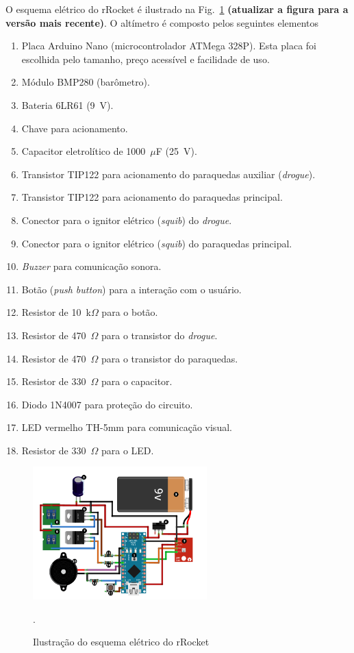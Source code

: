 \documentclass[12pt,a4paper]{article}
\begin{document}
O esquema elétrico do rRocket é ilustrado na Fig.~\ref{fig:rRocketelectronics} \textbf{(atualizar a figura para a versão mais recente)}. O altímetro é composto pelos seguintes elementos
\begin{enumerate}
	\item Placa Arduino Nano (microcontrolador ATMega 328P). Esta placa foi escolhida pelo tamanho, preço acessível e facilidade de uso.
	\item Módulo BMP280 (barômetro).
	\item Bateria 6LR61 (9~V).
	\item Chave para acionamento.
	\item Capacitor eletrolítico de 1000~$\mu$F (25~V).
	\item Transistor TIP122 para acionamento do paraquedas auxiliar (\textit{drogue}).
	\item Transistor TIP122 para acionamento do paraquedas principal.
	\item Conector para o ignitor elétrico (\textit{squib}) do \textit{drogue}.
	\item Conector para o ignitor elétrico (\textit{squib}) do paraquedas principal.
	\item \textit{Buzzer} para comunicação sonora.
	\item Botão (\textit{push button}) para a interação com o usuário.
	\item Resistor de 10~k$\Omega$ para o botão.
	\item Resistor de 470~$\Omega$ para o transistor do \textit{drogue}.
	\item Resistor de 470~$\Omega$ para o transistor do paraquedas.
	\item Resistor de 330~$\Omega$ para o capacitor.
	\item Diodo 1N4007 para proteção do circuito.
	\item LED vermelho TH-5mm para comunicação visual.
	\item Resistor de 330~$\Omega$ para o LED.
\end{enumerate}
\begin{figure}[!ht]
\centering
\includegraphics[width=0.6\textwidth]{./fig/electronics}
\caption{Ilustração do esquema elétrico do rRocket}.
\label{fig:rRocketelectronics}
\end{figure}
\end{document}
